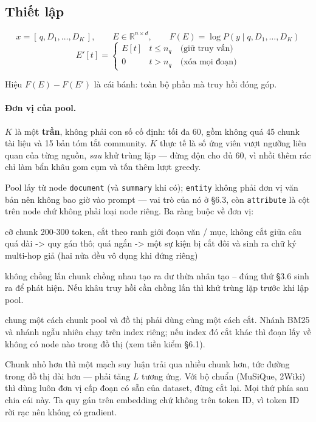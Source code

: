 \documentclass[11pt,a4paper]{article}
\begin{document}
\subsection{Thiết lập}

\[
x=[\,q,D_1,\dots,D_K\,],\qquad E\in\mathbb{R}^{n\times d},\qquad
F(E)=\log P\!\left(y \mid q,D_1,\dots,D_K\right)
\]
\[
E'[t]=\begin{cases} E[t] & t\le n_q \quad\text{(giữ truy vấn)}\\[2pt]
                    0 & t> n_q \quad\text{(xóa mọi đoạn)}\end{cases}
\]

Hiệu $F(E)-F(E')$ là cái bánh: toàn bộ phần mà truy hồi đóng góp.

\paragraph{Đơn vị của pool.} $K$ là một \textbf{trần}, không phải con số cố định: tối đa 60,
gồm không quá 45 chunk tài liệu và 15 bản tóm tắt community. $K$ thực tế là số ứng
viên vượt ngưỡng liên quan của từng nguồn, \emph{sau} khử trùng lặp --- đừng độn cho đủ 60, vì nhồi
thêm rác chỉ làm bẩn khâu gom cụm và tốn thêm lượt greedy.

Pool lấy từ node \texttt{document} (và \texttt{summary} khi có); \texttt{entity} không phải
đơn vị văn bản nên không bao giờ vào prompt --- vai trò của nó ở \S6.3, còn \texttt{attribute}
là cột trên node chứ không phải loại node riêng. Ba ràng buộc về đơn vị:

\begin{dia}
cỡ chunk     200-300 token, cắt theo ranh giới đoạn văn / mục, không cắt giữa câu
             quá dài -> quy gán thô; quá ngắn -> một sự kiện bị cắt đôi và sinh ra
             chữ ký multi-hop giả (hai nửa đều vô dụng khi đứng riêng)

không chồng lấn   chunk chồng nhau tạo ra dư thừa nhân tạo -- đúng thứ §3.6 sinh ra
             để phát hiện. Nếu khâu truy hồi cần chồng lấn thì khử trùng lặp
             trước khi lập pool.

chung một cách chunk   pool và đồ thị phải dùng cùng một cách cắt. Nhánh BM25 và
             nhánh ngẫu nhiên chạy trên index riêng; nếu index đó cắt khác thì
             đoạn lấy về không có node nào trong đồ thị (xem tiền kiểm §6.1).
\end{dia}

Chunk nhỏ hơn thì một mạch suy luận trải qua nhiều chunk hơn, tức đường trong đồ thị dài hơn
--- phải tăng $L$ tương ứng. Với bộ chuẩn (MuSiQue, 2Wiki) thì dùng luôn đơn vị cấp đoạn có
sẵn của dataset, đừng cắt lại. Mọi thứ phía sau chia cái này. Ta quy gán trên embedding chứ không trên token ID, vì token ID rời rạc nên không có gradient.
\end{document}
